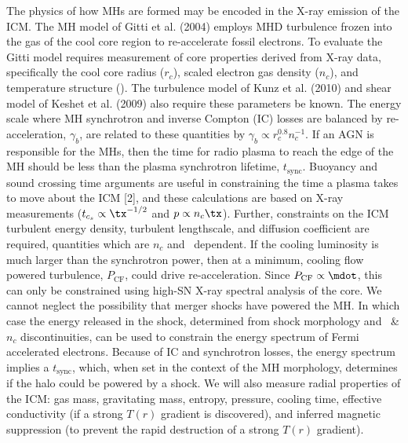 \documentclass[letterpaper,11pt]{article}
\begin{document}
 The physics of how
MHs are formed may be encoded in the X-ray emission of the ICM. The MH
model of Gitti et al. (2004) employs MHD turbulence frozen into the
gas of the cool core region to re-accelerate fossil electrons. To
evaluate the Gitti model requires measurement of core properties
derived from X-ray data, specifically the cool core radius ($r_c$),
scaled electron gas density ($n_c$), and temperature structure
(\tx). The turbulence model of Kunz et al. (2010) and shear model of
Keshet et al. (2009) also require these parameters be known. The
energy scale where MH synchrotron and inverse Compton (IC) losses are
balanced by re-acceleration, $\gamma_b$, are related to these
quantities by $\gamma_b \propto r_c^{0.8} n_c^{-1}$. If an AGN is
responsible for the MHs, then the time for radio plasma to reach the
edge of the MH should be less than the plasma synchrotron lifetime,
$t_{\mathrm{sync}}$. Buoyancy and sound crossing time arguments are
useful in constraining the time a plasma takes to move about the ICM
[2], and these calculations are based on X-ray measurements ($t_{c_s}
\propto \tx^{-1/2}$ and $p \propto n_c \tx$). Further, constraints on
the ICM turbulent energy density, turbulent lengthscale, and diffusion
coefficient are required, quantities which are $n_c$ and
\tx\ dependent. If the cooling luminosity is much larger than the
synchrotron power, then at a minimum, cooling flow powered turbulence,
$P_{\mathrm{CF}}$, could drive re-acceleration. Since $P_{\mathrm{CF}}
\propto \mdot$, this can only be constrained using high-SN X-ray
spectral analysis of the core. We cannot neglect the possibility that
merger shocks have powered the MH. In which case the energy released
in the shock, determined from shock morphology and \tx\ \& $n_c$
discontinuities, can be used to constrain the energy spectrum of Fermi
accelerated electrons. Because of IC and synchrotron losses, the
energy spectrum implies a $t_{\mathrm{sync}}$, which, when set in the
context of the MH morphology, determines if the halo could be powered
by a shock. We will also measure radial properties of the ICM: gas
mass, gravitating mass, entropy, pressure, cooling time, effective
conductivity (if a strong $T(r)$ gradient is discovered), and inferred
magnetic suppression (to prevent the rapid destruction of a strong
$T(r)$ gradient). \vspace{5.5pt}
\end{document}
